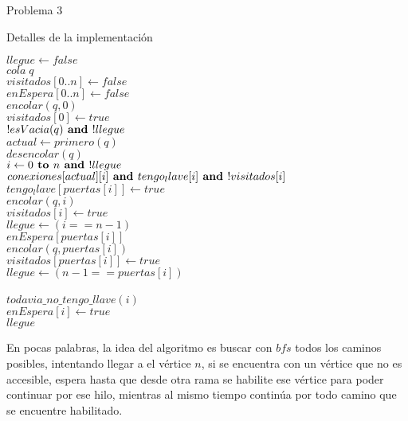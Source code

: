 \begin{section}{Problema 3}
\begin{subsection}{Detalles de la implementación}
		\begin{pseudo}
		\tab $llegue \leftarrow false$\\
		\tab $cola\; q$\\
		\tab $visitados[0..n] \leftarrow false$\\ 
		\tab $enEspera[0..n] \leftarrow false$\\ 
		\tab $encolar(q,0)$\\
		\tab $visitados[0] \leftarrow true$\\
		\tab \WHILE $!esVacia(q) \textbf{ and } !llegue$\\
		\tab \tab $actual \leftarrow primero(q)$\\
		\tab \tab $desencolar(q)$\\
		\tab \tab \FOR $ i\leftarrow0 \textbf{ to } n \textbf{ and } !llegue$\\
		\tab \tab \tab \IF	$conexiones[actual][i] \textbf{ and } tengo_llave[i] \textbf{ and }!visitados[i]$\\
		\tab \tab \tab \tab	$tengo_llave[puertas[i]] \leftarrow true$\\
		\tab \tab \tab \tab	$encolar(q,i)$\\
		\tab \tab \tab \tab	$visitados[i] \leftarrow true$\\
		\tab \tab \tab \tab	$llegue \leftarrow (i == n-1)$\\
		\tab \tab \tab \tab \IF	$enEspera[puertas[i]]$\\
		\tab \tab \tab \tab \tab $encolar(q,puertas[i])$\\
		\tab \tab \tab \tab \tab $visitados[puertas[i]] \leftarrow true$\\
		\tab \tab \tab \tab \tab $llegue \leftarrow (n-1==puertas[i])$\\
		\tab \tab \tab \ELSE \\
		\tab \tab \tab \tab \IF $todavia\_no\_tengo\_llave(i)$\\
		\tab \tab \tab \tab \tab $enEspera[i] \leftarrow true$\\
		\tab \RET $llegue$\\
		\end{pseudo}

		En pocas palabras, la idea del algoritmo es buscar con $bfs$ todos los caminos posibles, intentando llegar a el vértice $n$, si se encuentra con un vértice que no es accesible, espera hasta que desde otra rama se habilite ese vértice para poder continuar por ese hilo, mientras al mismo tiempo continúa por todo camino que se encuentre habilitado.\\


\end{subsection}
\end{section}
